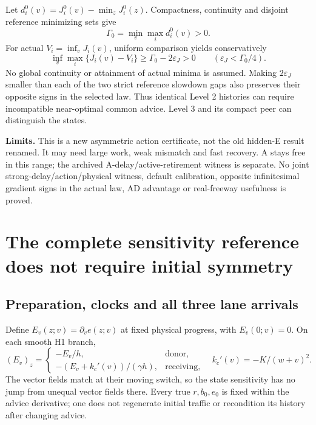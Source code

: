 \documentclass[11pt,a4paper]{article}
\newcommand{\kc}{k_c}
\begin{document}
Let $d_i^0(v)=J_i^0(v)-\min_zJ_i^0(z)$. Compactness, continuity and
disjoint reference minimizing sets give
\begin{equation}
 \Gamma_0=\min_v\max_i d_i^0(v)>0.
 \label{eq:referenceregret}
\end{equation}
For actual $V_i=\inf_vJ_i(v)$, uniform comparison yields conservatively
\begin{equation}
 \inf_v\max_i\{J_i(v)-V_i\}\geq\Gamma_0-2\varepsilon_J>0
 \qquad(\varepsilon_J<\Gamma_0/4).
 \label{eq:actualregret}
\end{equation}
No global continuity or attainment of actual minima is assumed. Making
$2\varepsilon_J$ smaller than each of the two strict reference slowdown
gaps also preserves their opposite signs in the selected law. Thus identical
Level 2 histories can require incompatible near-optimal common advice.
Level 3 and its compact peer can distinguish the states.

\textbf{Limits.} This is a new asymmetric action certificate, not the old
hidden-E result renamed. It may need large work, weak mismatch and fast
recovery. A stays free in this range; the archived A-delay/active-retirement
witness is separate. No joint strong-delay/action/physical witness, default
calibration, opposite infinitesimal gradient signs in the actual law,
AD advantage or real-freeway usefulness is proved.

\section{The complete sensitivity reference does not require initial symmetry}
\subsection{Preparation, clocks and all three lane arrivals}
Define $E_v(z;v)=\partial_ve(z;v)$ at fixed physical progress, with
$E_v(0;v)=0$. On each smooth H1 branch,
\begin{equation}
 (E_v)_z=\begin{cases}-E_v/h,&\text{donor},\\
 -(E_v+\kc'(v))/(\gamma h),&\text{receiving},\end{cases}
 \quad\kc'(v)=-K/(w+v)^2.
 \label{eq:prepsensitivity}
\end{equation}
The vector fields match at their moving switch, so the state sensitivity
has no jump from unequal vector fields there. Every true $r,b_0,e_0$ is
fixed within the advice derivative; one does not regenerate initial traffic
or recondition its history after changing advice.
\end{document}
